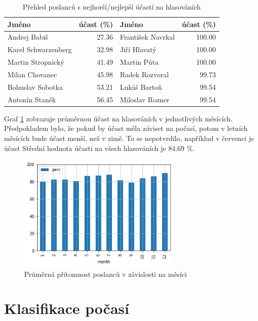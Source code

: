 \documentclass[12pt]{report}
\begin{document}
\begin{table}[h!]
    \centering
    \begin{tabular}{lr|lr}
    \hline
        Jméno & účast (\%) & Jméno &        účast (\%) \\
    \hline
        Andrej Babiš &  27.36 & František Navrkal &  100.00 \\
      Karel Schwarzenberg &  32.98 & Jiří Hlavatý &  100.00 \\
        Martin Stropnický &  41.49 & Martin Půta &  100.00 \\
           Milan Chovanec &  45.98 & Radek Rozvoral &   99.73 \\
         Bohuslav Sobotka &  53.21 & Lukáš Bartoň &   99.54 \\
          Antonín Staněk &  56.45 & Miloslav Rozner &   99.54
\end{tabular}
    \caption{Přehled poslanců s nejhorší/nejlepší účastí na hlasováních}
    \label{tbl:mila}
\end{table}

Graf \ref{fig:att_month} zobrazuje průměrnou účast na hlasováních v jednotlivých měsících. Předpokladem bylo, že pokud by účast měla záviset na počasí, potom v letních měsících bude účast menší, než v zimě. To se nepotvrdilo, například v červenci je účast   Střední hodnota účasti na všech hlasováních je $84.69$ \%.

\begin{figure}
    \centering
    \includegraphics[width=0.7\textwidth ]{images/att_per_month.png}
    \caption{Průměrná přítomnost poslanců v závislosti na měsíci}
    \label{fig:att_month}
\end{figure}

\section{Klasifikace počasí}
\end{document}
